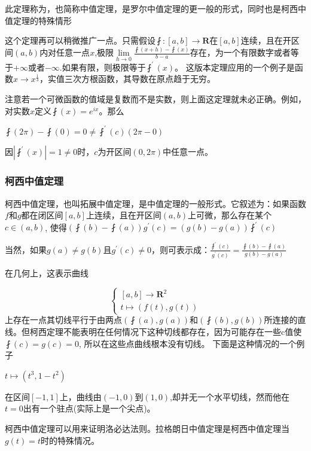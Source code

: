 \documentclass[UTF8]{ctexbook}
\newcommand{\limNormal}[1]{\lim\limits_{#1}}
\newcommand{\derivative}{^\prime}
\newcommand{\fDerivative}[1]{\fint\derivative(#1)}
\newcommand{\defFunction}[1]{\fint(#1)}
\begin{document}
{{{{此定理称为{}，也简称中值定理，是罗尔中值定理的更一般的形式，同时也是柯西中值定理的特殊情形

这个定理再可以稍微推广一点。只需假设$\fint : [a,b] \to \mathbf{R}$在$[a,b]$连续，且在开区间$(a,b)$内对任意一点$x$,极限$\limNormal{h \to 0}
  \frac{\defFunction{x + h} - \defFunction{x}}{b - a}$存在，为一个有限数字或者等于$+\infty$或者$-\infty$.如果有限，则极限等于$\fDerivative{x}$。
这版本定理应用的一个例子是函数$x \to x^{\frac{1}{3}}$，实值三次方根函数，其导数在原点趋于无穷。

注意若一个可微函数的值域是复数而不是实数，则上面这定理就未必正确。例如，对实数$x$定义$\defFunction{x} = e^{ix}$。那么

$\defFunction{2\pi} - \defFunction{0} = 0 \neq \fDerivative{c}(2\pi - 0)$

因$|\fDerivative{x}| = 1 \neq 0$时，$c$为开区间$(0,2\pi)$中任意一点。
}%

\subsubsection{柯西中值定理}{
  柯西中值定理，也叫拓展中值定理，是中值定理的一般形式。它叙述为：如果函数$f$和$g$都在闭区间$[a,b]$上连续，且在开区间$(a,b)$上可微，那么存在某个$c \in (a,b)$,
  使得$(\defFunction{b} - \defFunction{a})g\derivative(c) = (g(b)-g(a))\fDerivative{c}$

  当然，如果$g(a) \neq g(b)$且$g\derivative(c) \neq 0$，则可表示成：$\frac{\fDerivative{c}}{g\derivative(c)} = \frac{\defFunction{b} - \defFunction{a}}{g(b) - g(a)}$

  在几何上，这表示曲线

  $$
    \begin{cases}
      [a,b] \to \mathbf{R}^2 \\
      t \mapsto (f(t), g(t))
    \end{cases}
  $$
  上存在一点其切线平行于由两点$(\defFunction{a}, g(a))$和$(\defFunction{b}, g(b))$所连接的直线。但柯西定理不能表明在任何情况下这种切线都存在，因为可能存在一些c值使$\defFunction{c} = g(c) = 0$, 所以在这些点曲线根本没有切线。
  下面是这种情况的一个例子

  $t \mapsto (t^3, 1-t^2)$

  在区间$[-1,1]$上，曲线由$(-1, 0)$到$(1,0)$,却并无一个水平切线，然而他在$t = 0$出有一个驻点(实际上是一个尖点)。

  柯西中值定理可以用来证明洛必达法则。拉格朗日中值定理是柯西中值定理当$g(t) = t$时的特殊情况。
}%

}}}
\end{document}
